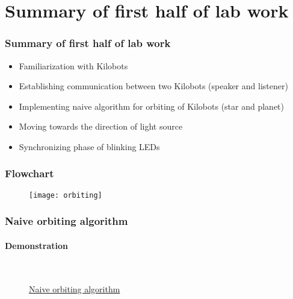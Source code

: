\section{Summary of first half of lab work}
\begin{frame}
    \frametitle{Summary of first half of lab work}
    \begin{itemize}
        \item Familiarization with Kilobots
        \item Establishing communication between two Kilobots (speaker and listener)
        \item Implementing naive algorithm for orbiting of Kilobots (star and planet)
        \item Moving towards the direction of light source
        \item Synchronizing phase of blinking LEDs
    \end{itemize}
\end{frame}

\begin{frame}
\frametitle{Flowchart}
\begin{figure}[H]
	\centering
	\texttt{[image: orbiting]}
\end{figure}
\end{frame}

\begin{frame}
\frametitle{Naive orbiting algorithm}
\framesubtitle{Demonstration}
\begin{figure}[H]
	\begin{center}
		\\
		\vspace{0.2cm}
		\caption{\href{https://youtu.be/jPBkttH8Q2o}{Naive orbiting algorithm}}
	\end{center}
\end{figure}
\end{frame}